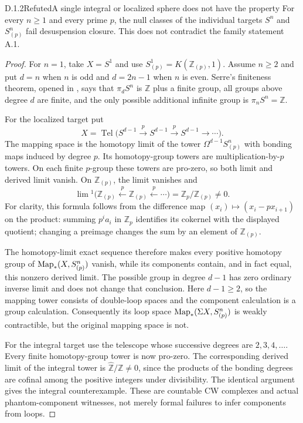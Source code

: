 \begin{claim}{D.1.2}{Refuted}{A single integral or localized sphere does not have the property}
For every $n\geq1$ and every prime $p$, the null classes of the individual targets $S^n$ and $S^n_{(p)}$ fail desuspension closure. This does not contradict the family statement A.1.
\end{claim}
\begin{proof}
For $n=1$, take $X=S^1$ and use $S^1_{(p)}=K(\mathbb Z_{(p)},1)$. Assume $n\geq2$ and put $d=n$ when $n$ is odd and $d=2n-1$ when $n$ is even. Serre's finiteness theorem, opened in \citet[Theorem 1.21]{HatcherSS}, says that $\pi_dS^n$ is $\mathbb Z$ plus a finite group, all groups above degree $d$ are finite, and the only possible additional infinite group is $\pi_nS^n=\mathbb Z$.

For the localized target put
\[
 X=\operatorname{Tel}\bigl(S^{d-1}\xrightarrow{p}S^{d-1}
                         \xrightarrow{p}S^{d-1}\longrightarrow\cdots\bigr).
\]
The mapping space is the homotopy limit of the tower $\Omega^{d-1}S^n_{(p)}$ with bonding maps induced by degree $p$. Its homotopy-group towers are multiplication-by-$p$ towers. On each finite $p$-group these towers are pro-zero, so both limit and derived limit vanish. On $\mathbb Z_{(p)}$, the limit vanishes and
\[
 \lim{}^1\bigl(\mathbb Z_{(p)}\xleftarrow{p}\mathbb Z_{(p)}\xleftarrow{p}\cdots\bigr)
       =\mathbb Z_p/\mathbb Z_{(p)}\neq0.
\]
For clarity, this formula follows from the difference map
$(x_i)\mapsto(x_i-px_{i+1})$ on the product: summing $p^ia_i$ in $\mathbb Z_p$ identifies its cokernel with the displayed quotient; changing a preimage changes the sum by an element of $\mathbb Z_{(p)}$.

The homotopy-limit exact sequence therefore makes every positive homotopy group of $\operatorname{Map}_*(X,S^n_{(p)})$ vanish, while its components contain, and in fact equal, this nonzero derived limit. The possible group in degree $d-1$ has zero ordinary inverse limit and does not change that conclusion. Here $d-1\geq2$, so the mapping tower consists of double-loop spaces and the component calculation is a group calculation. Consequently its loop space $\operatorname{Map}_*(\Sigma X,S^n_{(p)})$ is weakly contractible, but the original mapping space is not.

For the integral target use the telescope whose successive degrees are $2,3,4,\ldots$. Every finite homotopy-group tower is now pro-zero. The corresponding derived limit of the integral tower is $\widehat{\mathbb Z}/\mathbb Z\neq0$, since the products of the bonding degrees are cofinal among the positive integers under divisibility. The identical argument gives the integral counterexample. These are countable CW complexes and actual phantom-component witnesses, not merely formal failures to infer components from loops.
\end{proof}

